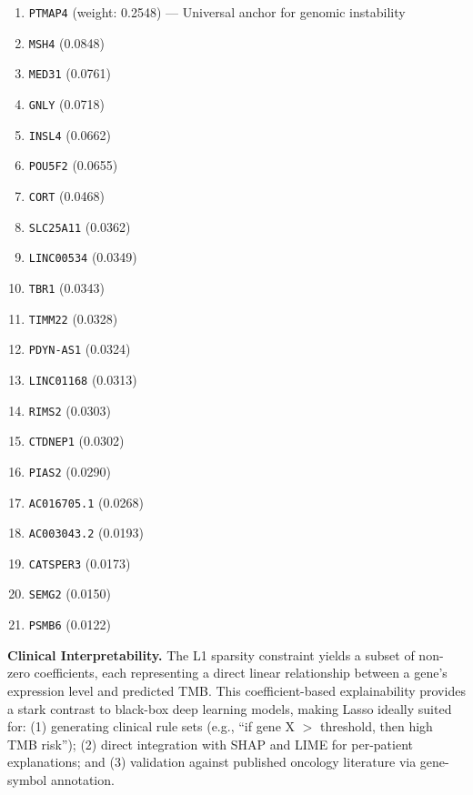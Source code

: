 \documentclass[11pt,a4paper]{article}
\begin{document}
\begin{enumerate}
\item \texttt{PTMAP4} (weight: 0.2548) — Universal anchor for genomic instability
\item \texttt{MSH4} (0.0848)
\item \texttt{MED31} (0.0761)
\item \texttt{GNLY} (0.0718)
\item \texttt{INSL4} (0.0662)
\item \texttt{POU5F2} (0.0655)
\item \texttt{CORT} (0.0468)
\item \texttt{SLC25A11} (0.0362)
\item \texttt{LINC00534} (0.0349)
\item \texttt{TBR1} (0.0343)
\item \texttt{TIMM22} (0.0328)
\item \texttt{PDYN-AS1} (0.0324)
\item \texttt{LINC01168} (0.0313)
\item \texttt{RIMS2} (0.0303)
\item \texttt{CTDNEP1} (0.0302)
\item \texttt{PIAS2} (0.0290)
\item \texttt{AC016705.1} (0.0268)
\item \texttt{AC003043.2} (0.0193)
\item \texttt{CATSPER3} (0.0173)
\item \texttt{SEMG2} (0.0150)
\item \texttt{PSMB6} (0.0122)
\end{enumerate}

\textbf{Clinical Interpretability.} The L1 sparsity constraint yields a subset of non-zero coefficients, each representing a direct linear relationship between a gene's expression level and predicted TMB. This coefficient-based explainability provides a stark contrast to black-box deep learning models, making Lasso ideally suited for: (1) generating clinical rule sets (e.g., ``if gene X $>$ threshold, then high TMB risk''); (2) direct integration with SHAP and LIME for per-patient explanations; and (3) validation against published oncology literature via gene-symbol annotation.
\end{document}
